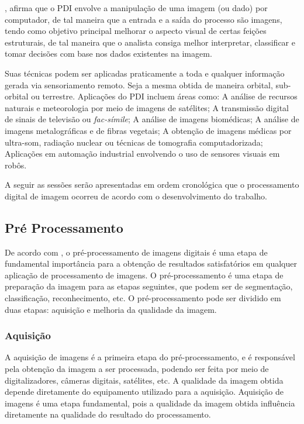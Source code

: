 \documentclass[conference]{IEEEtran}
\begin{document}
\cite{gonzalez2009}, afirma que o PDI envolve a manipulação de uma imagem (ou dado) por computador, 
de tal maneira que a entrada e a saída do processo são imagens, tendo como objetivo principal melhorar o 
aspecto visual de certas feições estruturais, de tal maneira que o analista consiga melhor interpretar, 
classificar e tomar decisões com base nos dados existentes na imagem.

Suas técnicas podem ser aplicadas praticamente a toda e qualquer informação gerada via sensoriamento remoto. 
Seja a mesma obtida de maneira orbital, sub-orbital ou terrestre. Aplicações do PDI incluem áreas como: 
A análise de recursos naturais e meteorologia por meio de imagens de satélites; 
A transmissão digital de sinais de televisão ou \emph{fac-símile}; A análise de imagens biomédicas; 
A análise de imagens metalográficas e de fibras vegetais; 
A obtenção de imagens médicas por ultra-som, radiação nuclear ou técnicas de tomografia computadorizada; 
Aplicações em automação industrial envolvendo o uso de sensores visuais em robôs.

A seguir as sessões serão apresentadas em ordem cronológica que o processamento 
digital de imagem ocorreu de acordo com o desenvolvimento do trabalho.

\subsection{Pré Processamento}

De acordo com \cite{gonzalez2009}, o pré-processamento de imagens digitais é uma etapa de fundamental importância 
para a obtenção de resultados satisfatórios em qualquer aplicação de processamento de imagens. 
O pré-processamento é uma etapa de preparação da imagem para as etapas seguintes, que podem ser de segmentação, 
classificação, reconhecimento, etc. 
O pré-processamento pode ser dividido em duas etapas: aquisição e melhoria da qualidade da imagem.

\subsubsection{Aquisição}

A aquisição de imagens é a primeira etapa do pré-processamento, e é responsável pela obtenção da imagem a ser 
processada, podendo ser feita por meio de digitalizadores, câmeras digitais, satélites, etc. A qualidade da imagem 
obtida depende diretamente do equipamento utilizado para a aquisição. Aquisição de imagens é uma etapa fundamental, 
pois a qualidade da imagem obtida influência diretamente na qualidade do resultado do processamento.
\end{document}
